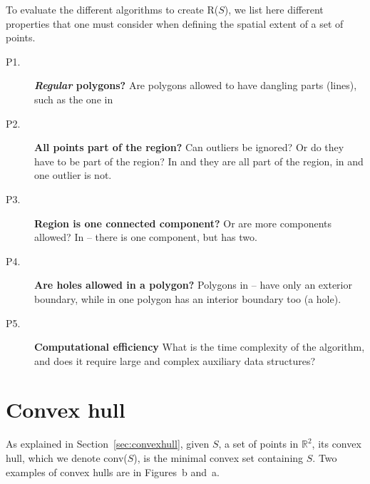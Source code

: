 To evaluate the different algorithms to create R($S$), we list here different properties that one must consider when defining the spatial extent of a set of points.
\begin{description}
  \item[P1.] \textbf{\emph{Regular} polygons?} Are polygons allowed to have dangling parts (lines), such as the one in 
  \item[P2.] \textbf{All points part of the region?} Can outliers be ignored? Or do they have to be part of the region? In  and  they are all part of the region, in  and  one outlier is not.
  \item[P3.] \textbf{Region is one connected component?} Or are more components allowed? In -- there is one component, but  has two.
  \item[P4.] \textbf{Are holes allowed in a polygon?} Polygons in -- have only an exterior boundary, while in  one polygon has an interior boundary too (a hole).
  \item[P5.] \textbf{Computational efficiency} What is the time complexity of the algorithm, and does it require large and complex auxiliary data structures?
\end{description}



%
\section{Convex hull}

As explained in Section~\ref{sec:convexhull}, given $S$, a set of points in $\mathbb{R}^2$, its convex hull, which we denote conv($S$), is the minimal convex set containing $S$.
Two examples of convex hulls are in Figures~b and~a.

%

